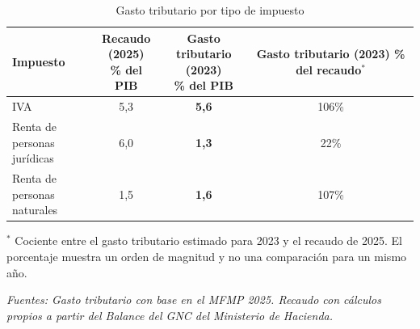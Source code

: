 \begin{frame}
\begin{table}[htbp]
\centering
\caption{Gasto tributario por tipo de impuesto}
\label{tab:gasto_tributario_recaudo}
\large
\setlength{\tabcolsep}{7pt}
\renewcommand{\arraystretch}{1.22}
\begin{tabular}{lccc}
\toprule
Impuesto
& \shortstack{Recaudo\\(2025)\\\% del PIB}
& \shortstack{Gasto tributario\\(2023)\\\% del PIB}
& \shortstack{Gasto tributario\\(2023)\\\% del recaudo$^{*}$} \\
\midrule
IVA & 5,3 & \textbf{5,6} & 106\% \\
\shortstack[l]{Renta de personas\\jurídicas} & 6,0 & \textbf{1,3} & 22\% \\
\shortstack[l]{Renta de personas\\naturales} & 1,5 & \textbf{1,6} & 107\% \\
\bottomrule
\end{tabular}
\vspace{0.35cm}

\par\scriptsize{$^{*}$ Cociente entre el gasto tributario estimado para 2023 y el recaudo de 2025. El porcentaje muestra un orden de magnitud y no una comparación para un mismo año.}

\vspace{0.12cm}
\par\scriptsize{\textit{Fuentes: Gasto tributario con base en el MFMP 2025. Recaudo con cálculos propios a partir del Balance del GNC del Ministerio de Hacienda.}}
\end{table}


\end{frame}

